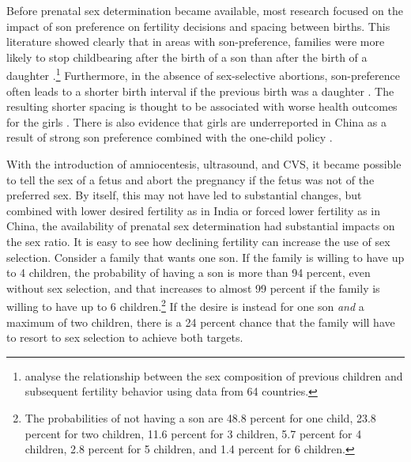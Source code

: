 \documentclass[]{article}
\begin{document}
Before prenatal sex determination became available, most research focused on the impact of son preference on fertility decisions and spacing between births. This literature showed clearly that in areas with son-preference, families were more likely to stop childbearing after the birth of a son than after the birth of a daughter \citep[see, for example,][]{Das1987,Arnold1997,clark00}.\footnote{\citet{filmer09} analyse the relationship between the sex composition of previous children and subsequent fertility behavior using data from 64 countries.} Furthermore, in the absence of sex-selective abortions, son-preference often leads to a shorter birth interval if the previous birth was a daughter \citep[see, for example,][]{Das1987,Rahman1993,Pong1994,Haughton1996,Arnold1997}. The resulting shorter spacing is thought to be associated with worse health outcomes for the girls \citep{arnold98,Whitworth2002,Rutstein2005,Conde-Agudelo2006}. There is also evidence that girls are underreported in China as a result of strong son preference combined with the one-child policy \citep{Merli2000}.

With the introduction of amniocentesis, ultrasound, and CVS, it became possible to tell the sex of a fetus and abort the pregnancy if the fetus was not of the preferred sex. By itself, this may not have led to substantial changes, but combined with lower desired fertility as in India or forced lower fertility as in China, the availability of prenatal sex determination had substantial impacts on the sex ratio. It is easy to see how declining fertility can increase the use of sex selection. Consider a family that wants one son. If the family is willing to have up to 4 children, the probability of having a son is more than 94 percent, even without sex selection, and that increases to almost 99 percent if the family is willing to have up to 6 children.\footnote{The probabilities of not having a son are 48.8 percent for one child, 23.8 percent for two children, 11.6 percent for 3 children, 5.7 percent for 4 children, 2.8 percent for 5 children, and 1.4 percent for 6 children.} If the desire is instead for one son \emph{and} a maximum of two children, there is a 24 percent chance that the family will have to resort to sex selection to achieve both targets.
\end{document}

